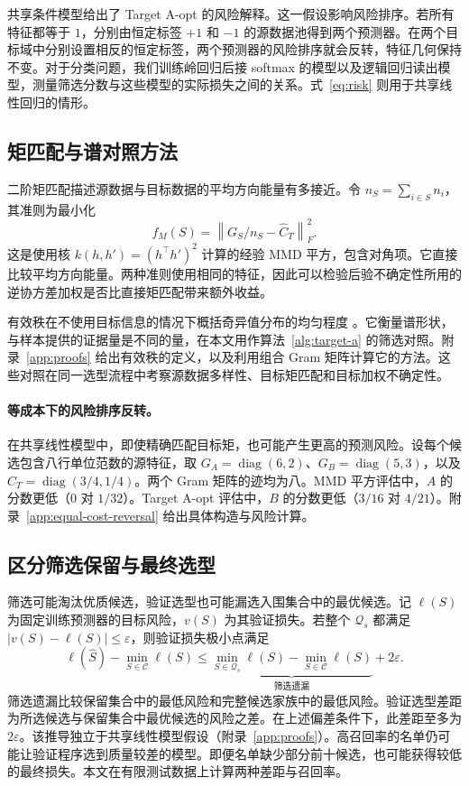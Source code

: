 \documentclass[UTF8,fontset=fandol,scheme=chinese,zihao=false,11pt,letterpaper]{ctexart}
\newcommand{\cC}{\mathcal{C}}
\newcommand{\cQ}{\mathcal{Q}}
\newcommand{\norm}[1]{\left\lVert#1\right\rVert}
\begin{document}
共享条件模型给出了 Target A-opt 的风险解释。这一假设影响风险排序。若所有特征都等于 $1$，分别由恒定标签 $+1$ 和 $-1$ 的源数据池得到两个预测器。在两个目标域中分别设置相反的恒定标签，两个预测器的风险排序就会反转，特征几何保持不变。对于分类问题，我们训练岭回归后接 softmax 的模型以及逻辑回归读出模型，测量筛选分数与这些模型的实际损失之间的关系。式~\eqref{eq:risk} 则用于共享线性回归的情形。

\subsection{矩匹配与谱对照方法}
二阶矩匹配描述源数据与目标数据的平均方向能量有多接近。令 $n_S=\sum_{i\in S}n_i$，其准则为最小化
\begin{equation}
 f_M(S)=\norm{G_S/n_S-\widehat C_T}_F^2.
 \label{eq:mmd}
\end{equation}
这是使用核 $k(h,h')=(h^\top h')^2$ 计算的经验 MMD 平方，包含对角项。它直接比较平均方向能量。两种准则使用相同的特征，因此可以检验后验不确定性所用的逆协方差加权是否比直接矩匹配带来额外收益。

有效秩在不使用目标信息的情况下概括奇异值分布的均匀程度 \citep{roy2007}。它衡量谱形状，与样本提供的证据量是不同的量，在本文用作算法~\ref{alg:target-a} 的筛选对照。附录~\ref{app:proofs} 给出有效秩的定义，以及利用组合 Gram 矩阵计算它的方法。这些对照在同一选型流程中考察源数据多样性、目标矩匹配和目标加权不确定性。

\paragraph{等成本下的风险排序反转。}
在共享线性模型中，即使精确匹配目标矩，也可能产生更高的预测风险。设每个候选包含八行单位范数的源特征，取 $G_A=\operatorname{diag}(6,2)$、$G_B=\operatorname{diag}(5,3)$，以及 $C_T=\operatorname{diag}(3/4,1/4)$。两个 Gram 矩阵的迹均为八。MMD 平方评估中，$A$ 的分数更低（$0$ 对 $1/32$）。Target A-opt 评估中，$B$ 的分数更低（$3/16$ 对 $4/21$）。附录~\ref{app:equal-cost-reversal} 给出具体构造与风险计算。

\subsection{区分筛选保留与最终选型}
筛选可能淘汰优质候选，验证选型也可能漏选入围集合中的最优候选。记 $\ell(S)$ 为固定训练预测器的目标风险，$v(S)$ 为其验证损失。若整个 $\cQ_s$ 都满足 $|v(S)-\ell(S)|\leq\varepsilon$，则验证损失极小点满足
\begin{equation}
 \ell(\widehat S)-\min_{S\in\cC}\ell(S)
 \leq
 \underbrace{\min_{S\in\cQ_s}\ell(S)-\min_{S\in\cC}\ell(S)}_{\text{筛选遗漏}}
 +2\varepsilon.
 \label{eq:decomposition}
\end{equation}
筛选遗漏比较保留集合中的最低风险和完整候选家族中的最低风险。验证选型差距为所选候选与保留集合中最优候选的风险之差。在上述偏差条件下，此差距至多为 $2\varepsilon$。该推导独立于共享线性模型假设（附录~\ref{app:proofs}）。高召回率的名单仍可能让验证程序选到质量较差的模型。即便名单缺少部分前十候选，也可能获得较低的最终损失。本文在有限测试数据上计算两种差距与召回率。
\end{document}
